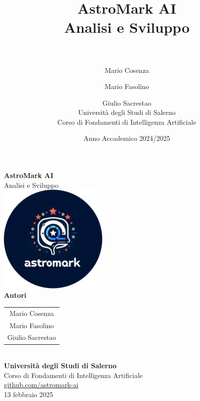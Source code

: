 \documentclass[a4paper,12pt]{report}
\title{%
  \textbf{AstroMark AI}\\[0.5cm]
  \large Analisi e Sviluppo\\[0.5cm]

  \\
}
\author{%
  Mario Cosenza \and
  Mario Fasolino \and
  Giulio Sacrestao\\[0.5cm]
  Università degli Studi di Salerno\\
  Corso di Fondamenti di Intelligenza Artificiale%
}
\date{Anno Accademico 2024/2025}
\begin{document}
\begin{titlepage}
    \centering
    \vspace*{1.5cm}

    {\Huge \textbf{AstroMark AI}}\\[1cm]
    {\Large {Analisi e Sviluppo}}\\[2cm]

    \includegraphics[width=0.4\textwidth]{images/astromarkLogo.jpg}\\[2.0cm]

    {\LARGE \textbf{Autori}}\\[0.5cm]
    \begin{tabular}{c}
        {\Large {Mario Cosenza}} \\[0.3cm]
        {\Large {Mario Fasolino}} \\[0.3cm]
        {\Large {Giulio Sacrestao}}
    \end{tabular}\\[1.5cm]

    {\large \textbf{Università degli Studi di Salerno}}\\[0.3cm]
    {\large Corso di Fondamenti di Intelligenza Artificiale}\\[0.3cm]

    {\Large \href{https://github.com/mariocosenza/astromark-ai}{\faGithub\; github.com/astromark-ai}}\\[2.0cm]

    {\large 13 febbraio 2025}

    \vfill
\end{titlepage}
\newpage

\pagestyle{fancy}
\fancyhf{}
\fancyfoot[C]{\thepage}

\tableofcontents
\newpage











\appendix

\end{document}
